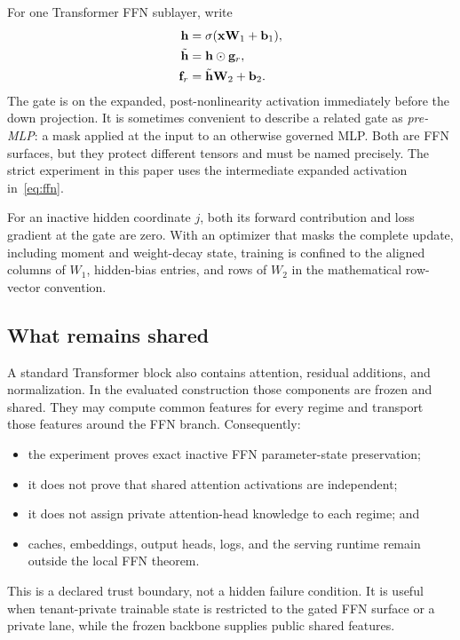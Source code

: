 \documentclass[11pt]{article}
\begin{document}
For one Transformer FFN sublayer, write
\begin{align}
  \mathbf{h} &= \sigma(\mathbf{x}\mathbf{W}_1+\mathbf b_1),\\
  \tilde{\mathbf{h}} &= \mathbf{h}\odot\mathbf{g}_r,\\
  \mathbf f_r &= \tilde{\mathbf{h}}\mathbf{W}_2+\mathbf b_2.
  \label{eq:ffn}
\end{align}
The gate is on the expanded, post-nonlinearity activation immediately before
the down projection. It is sometimes convenient to describe a related gate as
\emph{pre-MLP}: a mask applied at the input to an otherwise governed MLP. Both
are FFN surfaces, but they protect different tensors and must be named
precisely. The strict experiment in this paper uses the intermediate expanded
activation in~\eqref{eq:ffn}.

For an inactive hidden coordinate $j$, both its forward contribution and loss
gradient at the gate are zero. With an optimizer that masks the complete update,
including moment and weight-decay state, training is confined to the aligned
columns of $W_1$, hidden-bias entries, and rows of $W_2$ in the mathematical
row-vector convention.

\subsection{What remains shared}

A standard Transformer block also contains attention, residual additions, and
normalization. In the evaluated construction those components are frozen and
shared. They may compute common features for every regime and transport those
features around the FFN branch. Consequently:
\begin{itemize}
  \item the experiment proves exact inactive FFN parameter-state preservation;
  \item it does not prove that shared attention activations are independent;
  \item it does not assign private attention-head knowledge to each regime; and
  \item caches, embeddings, output heads, logs, and the serving runtime remain
  outside the local FFN theorem.
\end{itemize}

This is a declared trust boundary, not a hidden failure condition. It is useful
when tenant-private trainable state is restricted to the gated FFN surface or a
private lane, while the frozen backbone supplies public shared features.
\end{document}
